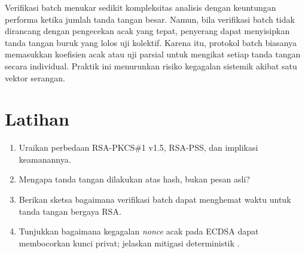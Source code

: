 \documentclass[../main.tex]{subfiles}
\begin{document}
Verifikasi batch menukar sedikit kompleksitas analisis dengan keuntungan performa ketika jumlah tanda tangan besar. Namun, bila verifikasi batch tidak dirancang dengan pengecekan acak yang tepat, penyerang dapat menyisipkan tanda tangan buruk yang lolos uji kolektif. Karena itu, protokol batch biasanya memasukkan koefisien acak atau uji parsial untuk mengikat setiap tanda tangan secara individual. Praktik ini menurunkan risiko kegagalan sistemik akibat satu vektor serangan.

\section{Latihan}
\begin{enumerate}
  \item Uraikan perbedaan RSA-PKCS\#1 v1.5, RSA-PSS, dan implikasi keamanannya.
  \item Mengapa tanda tangan dilakukan atas hash, bukan pesan asli?
  \item Berikan sketsa bagaimana verifikasi batch dapat menghemat waktu untuk tanda tangan bergaya RSA.
  \item Tunjukkan bagaimana kegagalan \emph{nonce} acak pada ECDSA dapat membocorkan kunci privat; jelaskan mitigasi deterministik \citep{rfc6979}.
\end{enumerate}
\end{document}

